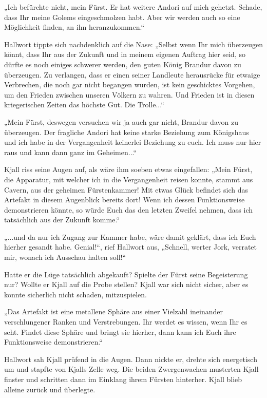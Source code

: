 „Ich befürchte nicht, mein Fürst. Er hat weitere Andori auf mich gehetzt. Schade, dass Ihr meine Golems eingeschmolzen habt. Aber wir werden auch so eine Möglichkeit finden, an ihn heranzukommen.“

Hallwort tippte sich nachdenklich auf die Nase: „Selbst wenn Ihr mich überzeugen könnt, dass Ihr aus der Zukunft und in meinem eigenen Auftrag hier seid, so dürfte es noch einiges schwerer werden, den guten König Brandur davon zu überzeugen. Zu verlangen, dass er einen seiner Landleute herausrücke für etwaige Verbrechen, die noch gar nicht begangen wurden, ist kein geschicktes Vorgehen, um den Frieden zwischen unseren Völkern zu wahren. Und Frieden ist in diesen kriegerischen Zeiten das höchste Gut. Die Trolle...“

„Mein Fürst, deswegen versuchen wir ja auch gar nicht, Brandur davon zu überzeugen. Der fragliche Andori hat keine starke Beziehung zum Königshaus und ich habe in der Vergangenheit keinerlei Beziehung zu euch. Ich muss nur hier raus und kann dann ganz im Geheimen...“

Kjall riss seine Augen auf, als wäre ihm soeben etwas eingefallen: „Mein Fürst, die Apparatur, mit welcher ich in die Vergangenheit reisen konnte, stammt aus Cavern, aus der geheimen Fürstenkammer! Mit etwas Glück befindet sich das Artefakt in diesem Augenblick bereits dort! Wenn ich dessen Funktionsweise demonstrieren könnte, so würde Euch das den letzten Zweifel nehmen, dass ich tatsächlich aus der Zukunft komme.“

„...und da nur ich Zugang zur Kammer habe, wäre damit geklärt, dass ich Euch hierher gesandt habe. Genial!“, rief Hallwort aus, „Schnell, werter Jork, verratet mir, wonach ich Ausschau halten soll!“

Hatte er die Lüge tatsächlich abgekauft? Spielte der Fürst seine Begeisterung nur? Wollte er Kjall auf die Probe stellen? Kjall war sich nicht sicher, aber es konnte sicherlich nicht schaden, mitzuspielen.

„Das Artefakt ist eine metallene Sphäre aus einer Vielzahl ineinander verschlungener Ranken und Verstrebungen. Ihr werdet es wissen, wenn Ihr es seht. Findet diese Sphäre und bringt sie hierher, dann kann ich Euch ihre Funktionsweise demonstrieren.“

Hallwort sah Kjall prüfend in die Augen. Dann nickte er, drehte sich energetisch um und stapfte von Kjalls Zelle weg. Die beiden Zwergenwachen musterten Kjall finster und schritten dann im Einklang ihrem Fürsten hinterher. Kjall blieb alleine zurück und überlegte.



